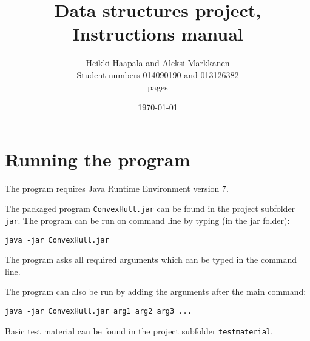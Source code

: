 \documentclass[a4paper,12pt,leqno,titlepage]{article}
\begin{document}
\begin{titlepage}
\title{Data structures project, \\
Instructions manual}
\author{Heikki Haapala and Aleksi Markkanen\\
Student numbers 014090190 and 013126382\\
\pageref{LastPage} pages}
\date{\today}
\end{titlepage}
\maketitle
\pagebreak
\tableofcontents
\pagebreak



\begin{comment}
Käyttöohje
Miten ohjelma suoritetaan, miten eri toiminnallisuuksia käytetään
Minkä muotoisia syötteitä ohjelma hyväksyy
Missä kansiossa on jar ja ajamiseen tarvittavat testitiedostot.
\end{comment}

\section{Running the program}
The program requires Java Runtime Environment version 7.

The packaged program \texttt{ConvexHull.jar} can be found in the project subfolder \texttt{jar}.
The program can be run on command line by typing (in the jar folder):

\texttt{java -jar ConvexHull.jar}

The program asks all required arguments which can be typed in the command line.

The program can also be run by adding the arguments after the main command:

\texttt{java -jar ConvexHull.jar arg1 arg2 arg3 ...}

Basic test material can be found in the project subfolder \texttt{testmaterial}.

\pagebreak
\end{document}
